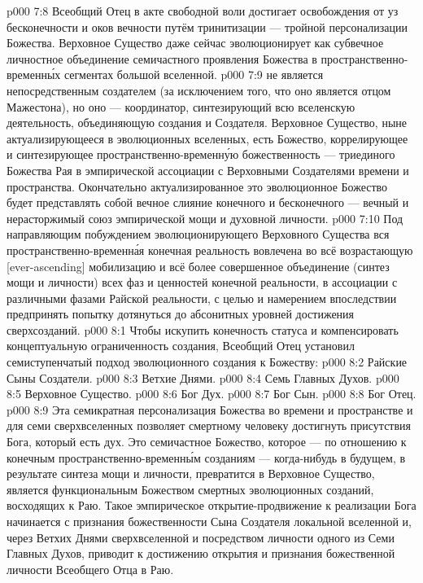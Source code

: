 \vs p000 7:8 Всеобщий Отец в акте свободной воли достигает освобождения от уз бесконечности и оков вечности путём тринитизации --- тройной персонализации Божества. Верховное Существо даже сейчас эволюционирует как субвечное личностное объединение семичастного проявления Божества в пространственно\hyp{}временн\'ых сегментах большой вселенной.
\vs p000 7:9 \pc {} не является непосредственным создателем (за исключением того, что оно является отцом Мажестона), но оно --- координатор, синтезирующий всю вселенскую деятельность, объединяющую создания и Создателя. Верховное Существо, ныне актуализирующееся в эволюционных вселенных, есть Божество, коррелирующее и синтезирующее пространственно\hyp{}временн\'ую божественность --- триединого Божества Рая в эмпирической ассоциации с Верховными Создателями времени и пространства. Окончательно актуализированное это эволюционное Божество будет представлять собой вечное слияние конечного и бесконечного --- вечный и нерасторжимый союз эмпирической мощи и духовной личности.
\vs p000 7:10 Под направляющим побуждением эволюционирующего Верховного Существа вся пространственно\hyp{}временн\'ая конечная реальность вовлечена во всё возрастающую [ever\hyp{}ascending] мобилизацию и всё более совершенное объединение (синтез мощи и личности) всех фаз и ценностей конечной реальности, в ассоциации с различными фазами Райской реальности, с целью и намерением впоследствии предпринять попытку дотянуться до абсонитных уровней достижения сверхсозданий.
\vs p000 8:1 Чтобы искупить конечность статуса и компенсировать концептуальную ограниченность создания, Всеобщий Отец установил семиступенчатый подход эволюционного создания к Божеству:
\vs p000 8:2 \bibnobreakspace Райские Сыны Создатели.
\vs p000 8:3 \bibnobreakspace Ветхие Днями.
\vs p000 8:4 \bibnobreakspace Семь Главных Духов.
\vs p000 8:5 \bibnobreakspace Верховное Существо.
\vs p000 8:6 \bibnobreakspace Бог Дух.
\vs p000 8:7 \bibnobreakspace Бог Сын.
\vs p000 8:8 \bibnobreakspace Бог Отец.
\vs p000 8:9 \pc Эта семикратная персонализация Божества во времени и пространстве и для семи сверхвселенных позволяет смертному человеку достигнуть присутствия Бога, который есть дух. Это семичастное Божество, которое --- по отношению к конечным пространственно\hyp{}временн\'ым созданиям --- когда\hyp{}нибудь в будущем, в результате синтеза мощи и личности, превратится в Верховное Существо, является функциональным Божеством смертных эволюционных созданий, восходящих к Раю. Такое эмпирическое открытие\hyp{}продвижение к реализации Бога начинается с признания божественности Сына Создателя локальной вселенной и, через Ветхих Днями сверхвселенной и посредством личности одного из Семи Главных Духов, приводит к достижению открытия и признания божественной личности Всеобщего Отца в Раю.
